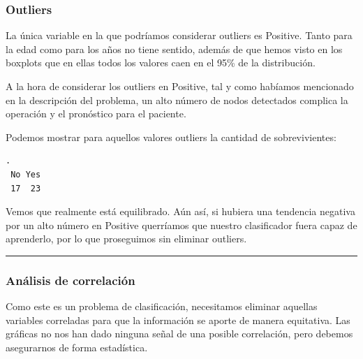 \documentclass[
]{article}
\newenvironment{Shaded}{\begin{snugshade}}{\end{snugshade}}
\newcommand{\DecValTok}[1]{\textcolor[rgb]{0.00,0.00,0.81}{#1}}
\newcommand{\KeywordTok}[1]{\textcolor[rgb]{0.13,0.29,0.53}{\textbf{#1}}}
\newcommand{\NormalTok}[1]{#1}
\newcommand{\OperatorTok}[1]{\textcolor[rgb]{0.81,0.36,0.00}{\textbf{#1}}}
\newcommand{\StringTok}[1]{\textcolor[rgb]{0.31,0.60,0.02}{#1}}
\begin{document}
\hypertarget{outliers}{%
\subsubsection{Outliers}\label{outliers}}

La única variable en la que podríamos considerar outliers es Positive.
Tanto para la edad como para los años no tiene sentido, además de que
hemos visto en los boxplots que en ellas todos los valores caen en el
95\% de la distribución.

A la hora de considerar los outliers en Positive, tal y como habíamos
mencionado en la descripción del problema, un alto número de nodos
detectados complica la operación y el pronóstico para el paciente.

Podemos mostrar para aquellos valores outliers la cantidad de
sobrevivientes:

\begin{Shaded}
\end{Shaded}

\begin{verbatim}
.
 No Yes 
 17  23 
\end{verbatim}

Vemos que realmente está equilibrado. Aún así, si hubiera una tendencia
negativa por un alto número en Positive querríamos que nuestro
clasificador fuera capaz de aprenderlo, por lo que proseguimos sin
eliminar outliers.

\begin{center}\rule{0.5\linewidth}{0.5pt}\end{center}

\hypertarget{anuxe1lisis-de-correlaciuxf3n}{%
\subsubsection{Análisis de
correlación}\label{anuxe1lisis-de-correlaciuxf3n}}

Como este es un problema de clasificación, necesitamos eliminar aquellas
variables correladas para que la información se aporte de manera
equitativa. Las gráficas no nos han dado ninguna señal de una posible
correlación, pero debemos asegurarnos de forma estadística.
\end{document}

